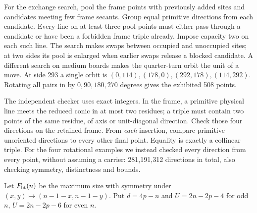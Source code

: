 \documentclass[10pt]{article}
\begin{document}
For the exchange search, pool the frame points with previously added sites and candidates meeting few frame secants. Group equal primitive directions from each candidate. Every line on at least three pool points must either pass through a candidate or have been a forbidden frame triple already. Impose capacity two on each such line. The search makes swaps between occupied and unoccupied sites; at two sides its pool is enlarged when earlier swaps release a blocked candidate. A different search on medium boards makes the quarter-turn orbit the unit of a move. At side 293 a single orbit is $(0,114),(178,0),(292,178),(114,292)$. Rotating all pairs in  by $0,90,180,270$ degrees gives the exhibited 508 points.

The independent checker uses exact integers. In the frame, a primitive physical line meets the reduced conic in at most two residues; a triple must contain two points of the same residue, of axis or unit-diagonal direction. Check those four directions on the retained frame. From \emph{each} insertion, compare primitive unoriented directions to every other final point. Equality is exactly a collinear triple. For the four rotational examples we instead checked every direction from every point, without assuming a carrier: 281,191,312 directions in total, also checking symmetry, distinctness and bounds.

\newpage{}
Let $F_{\rm ht}(n)$ be the maximum size with symmetry under $(x,y)\mapsto(n-1-x,n-1-y)$. Put $d=4p-n$ and $U=2n-2p-4$ for odd $n$, $U=2n-2p-6$ for even $n$.
\end{document}
